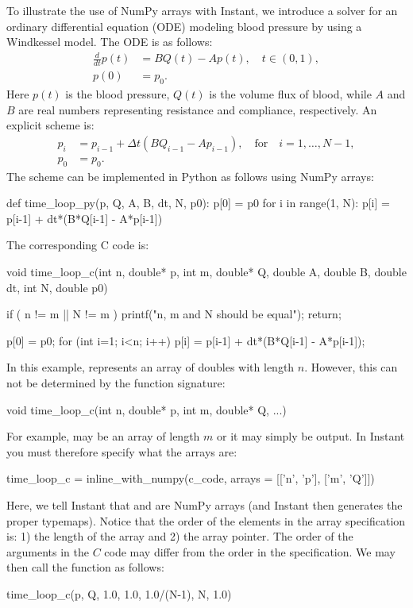 To illustrate the use of NumPy arrays with Instant, we introduce a
solver for an ordinary differential equation (ODE) modeling blood
pressure by using a Windkessel model. The ODE
is as follows:
\begin{align}
\frac{d}{dt}p(t) &= B Q(t) - A p(t), \quad t \in (0,1), \\
p(0) &= p_0.
\end{align}
Here $p(t)$ is the blood pressure, $Q(t)$ is the volume flux of blood,
while $A$ and $B$ are real numbers representing resistance and compliance, respectively.
An explicit scheme is:
\begin{align}
p_i &= p_{i-1} + \Delta t (B Q_{i-1} - A p_{i-1}), \quad \mbox{for}\quad i=1,\ldots,N-1, \\
p_0 &= p_0.
\end{align}
The scheme can be implemented in Python as follows using NumPy arrays:
\begin{python}
def time_loop_py(p, Q, A, B, dt, N, p0):
    p[0] = p0
    for i in range(1, N):
        p[i] = p[i-1] + dt*(B*Q[i-1] - A*p[i-1])
\end{python}
The corresponding C code is:
\begin{c++}
void time_loop_c(int n, double* p,
                 int m, double* Q,
                 double A, double B,
                 double dt, int N, double p0)
{
    if ( n != m || N != m )
    {
        printf("n, m and N should be equal\n");
        return;
    }

    p[0] = p0;
    for (int i=1; i<n; i++)
    {
        p[i] = p[i-1] + dt*(B*Q[i-1] - A*p[i-1]);
    }
}
\end{c++}
In this example,  represents an array of
doubles with length $n$. However, this can not be determined by the
function signature:
\begin{c++}
void time_loop_c(int n, double* p, int m, double* Q, ...)
\end{c++}
For example,  may be an array of length $m$ or it may simply be
output. In Instant you must therefore specify what the arrays are:
\begin{python}
time_loop_c = inline_with_numpy(c_code,
                                arrays = [['n', 'p'],
                                          ['m', 'Q']])
\end{python}
Here, we tell Instant that  and
 are NumPy arrays (and Instant then generates the
proper typemaps). Notice that the order of the elements in the array specification is: 1) the length of the array and 2) the array pointer. The order
of the arguments in the $C$ code may differ from the order in the  specification.
We may then call the 
function as follows:
\begin{python}
time_loop_c(p, Q, 1.0, 1.0, 1.0/(N-1), N, 1.0)
\end{python}

